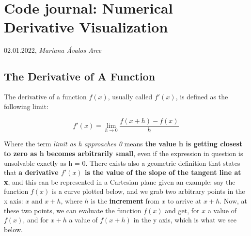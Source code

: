 \documentclass[12pt]{article}
\date{}
\begin{document}

 

\section*{\textbf{Code journal: Numerical Derivative Visualization}}

02.01.2022, \textit{Mariana Ávalos Arce}

\subsection*{The Derivative of A Function}

The derivative of a function $f(x)$, usually called $f'(x)$, is defined as the following limit:

\begin{equation}
    f'(x) = \lim_{h\to0} \frac{f(x+h) - f(x)}{h}
\end{equation}

Where the term \textit{limit as h approaches 0} means \textbf{the value h is getting closest to zero as h becomes arbitrarily small}, even if the expression in question is unsolvable exactly as h = 0. There exists also a geometric definition that states that \textbf{a derivative $f'(x)$ is the value of the slope of the tangent line at x}, and this can be represented in a Cartesian plane given an example: say the function $f(x)$ is a curve plotted below, and we grab two arbitrary points in the x axis: $x$ and $x+h$, where $h$ is the \textbf{increment} from $x$ to arrive at $x+h$. Now, at these two points, we can evaluate the function $f(x)$ and get, for $x$ a value of $f(x)$, and for $x+h$ a value of $f(x+h)$ in the y axis, which is what we see below.
\end{document}
